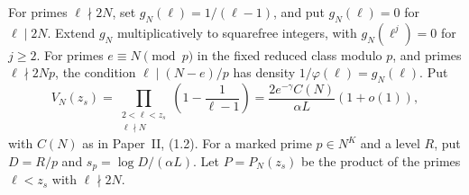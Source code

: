 For primes \(\ell\nmid2N\), set \(g_N(\ell)=1/(\ell-1)\), and put
\(g_N(\ell)=0\) for \(\ell\mid2N\). Extend \(g_N\) multiplicatively to
squarefree integers, with \(g_N(\ell^j)=0\) for \(j\ge2\). For primes
\(e\equiv N\pmod p\) in the fixed reduced class modulo \(p\), and primes
\(\ell\nmid2Np\), the condition \(\ell\mid(N-e)/p\) has
density \(1/\varphi(\ell)=g_N(\ell)\). Put
\begin{equation}\label{eq:ra-euler-density}
 V_N(z_s)=\prod_{\substack{2<\ell<z_s\\\ell\nmid N}}
       \left(1-\frac1{\ell-1}\right)
 =\frac{2e^{-\gamma}C(N)}{\alpha L}(1+o(1)),
\end{equation}
with \(C(N)\) as in Paper~II, (1.2). For a marked prime \(p\in N^K\) and a
level \(R\), put \(D=R/p\) and \(s_p=\log D/(\alpha L)\).
Let \(P=P_N(z_s)\) be the product of the primes \(\ell<z_s\) with
\(\ell\nmid2N\).

